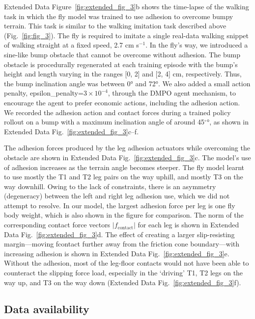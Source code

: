 \documentclass[sn-mathphys-num]{sn-jnl}%
\theoremstyle{thmstyleone}%
\theoremstyle{thmstyletwo}%
\theoremstyle{thmstylethree}%
\begin{document}
Extended Data Figure~\ref{fig:extended_fig_3}b shows the time-lapse of the walking task in which the fly model was trained to use adhesion to overcome bumpy terrain. 
This task is similar to the walking imitation task described above (Fig.~\ref{fig:fig_3}). 
The fly is required to imitate a single real-data walking snippet of walking straight at a fixed speed, 2.7 cm s$ ^{-1} $.
In the fly’s way, we introduced a sine-like bump obstacle that cannot be overcome without adhesion. 
The bump obstacle is procedurally regenerated at each training episode with the bump’s height and length varying in the ranges [0, 2] and [2, 4] cm, respectively.
Thus, the bump inclination angle was between 0° and 72°. 
We also added a small action penalty, epsilon\_penalty=$ 3\times 10^{-4} $, through the DMPO agent mechanism, to encourage the agent to prefer economic actions, including the adhesion action. 
We recorded the adhesion action and contact forces during a trained policy rollout on a bump with a maximum inclination angle of around 45$ ^\circ $°, as shown in Extended Data Fig.~\ref{fig:extended_fig_3}c–f.


The adhesion forces produced by the leg adhesion actuators while overcoming the obstacle are shown in Extended Data Fig.~\ref{fig:extended_fig_3}c. 
The model’s use of adhesion increases as the terrain angle becomes steeper. 
The fly model learnt to use mostly the T1 and T2 leg pairs on the way uphill, and mostly T3 on the way downhill. 
Owing to the lack of constraints, there is an asymmetry (degeneracy) between the left and right leg adhesion use, which we did not attempt to resolve. 
In our model, the largest adhesion force per leg is one fly body weight, which is also shown in the figure for comparison. The norm of the corresponding contact force vectors $ | f_\text{contact} | $ for each leg is shown in Extended Data Fig.~\ref{fig:extended_fig_3}d. 
The effect of creating a larger slip-resisting margin—moving fcontact further away from the friction cone boundary—with increasing adhesion is shown in Extended Data Fig.~\ref{fig:extended_fig_3}e. 
Without the adhesion, most of the leg-floor contacts would not have been able to counteract the slipping force load, especially in the ‘driving’ T1, T2 legs on the way up, and T3 on the way down (Extended Data Fig.~\ref{fig:extended_fig_3}f).



\subsection{Data availability} \label{sec:data_availability}
\end{document}
